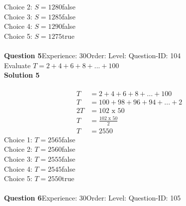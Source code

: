 \documentclass{article}
\begin{document}
Choice 2: \hspace{20pt}$S=1280$\hspace{20pt}false\\
Choice 3: \hspace{20pt}$S=1285$\hspace{20pt}false\\
Choice 4: \hspace{20pt}$S=1290$\hspace{20pt}false\\
Choice 5: \hspace{20pt}$S=1275$\hspace{20pt}true\\
\\[4pt]
\noindent\textbf{Question 5}\hspace{20pt}Experience: 30\hspace{20pt}Order: \hspace{20pt}Level: \hspace{20pt}Question-ID: 104\\[2pt]
Evaluate $T=2+4+6+8+...+100$\\[4pt]
\noindent\textbf{Solution 5}\\[2pt]
\\[-35pt]\begin{align*}
T&=2+4+6+8+...+100\\[2pt]
T&=100+98+96+94+...+2\\[2pt]
2T&=102\,\,\text{x}\,\,50\\[2pt]
T&=\displaystyle\frac{102\,\,\text{x}\,\,50}{2}\\[2pt]
T&=2550
\end{align*}
Choice 1: \hspace{20pt}$T=2565$\hspace{20pt}false\\
Choice 2: \hspace{20pt}$T=2560$\hspace{20pt}false\\
Choice 3: \hspace{20pt}$T=2555$\hspace{20pt}false\\
Choice 4: \hspace{20pt}$T=2545$\hspace{20pt}false\\
Choice 5: \hspace{20pt}$T=2550$\hspace{20pt}true\\
\\[4pt]
\noindent\textbf{Question 6}\hspace{20pt}Experience: 30\hspace{20pt}Order: \hspace{20pt}Level: \hspace{20pt}Question-ID: 105\\[2pt]
\end{document}
